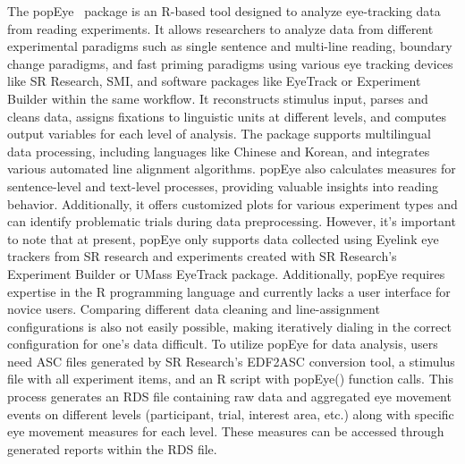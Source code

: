 \documentclass[twocolumn]{article}
\begin{document}
The popEye~\cite{schroederPopEyePackageAnalyse2022} package is an R-based tool designed to analyze eye-tracking data from reading experiments. It allows researchers to analyze data from different experimental paradigms such as single sentence and multi-line reading, boundary change paradigms, and fast priming paradigms using various eye tracking devices like SR Research, SMI, and software packages like EyeTrack or Experiment Builder within the same workflow. It reconstructs stimulus input, parses and cleans data, assigns fixations to linguistic units at different levels, and computes output variables for each level of analysis. The package supports multilingual data processing, including languages like Chinese and Korean, and integrates various automated line alignment algorithms. popEye also calculates measures for sentence-level and text-level processes, providing valuable insights into reading behavior. Additionally, it offers customized plots for various experiment types and can identify problematic trials during data preprocessing. However, it's important to note that at present, popEye only supports data collected using Eyelink eye trackers from SR research and experiments created with SR Research's Experiment Builder or UMass EyeTrack package. Additionally, popEye requires expertise in the R programming language and currently lacks a user interface for novice users. Comparing different data cleaning and line-assignment configurations is also not easily possible, making iteratively dialing in the correct configuration for one's data difficult. To utilize popEye for data analysis, users need ASC files generated by SR Research's EDF2ASC conversion tool, a stimulus file with all experiment items, and an R script with popEye() function calls. This process generates an RDS file containing raw data and aggregated eye movement events on different levels (participant, trial, interest area, etc.) along with specific eye movement measures for each level. These measures can be accessed through generated reports within the RDS file.
\end{document}
